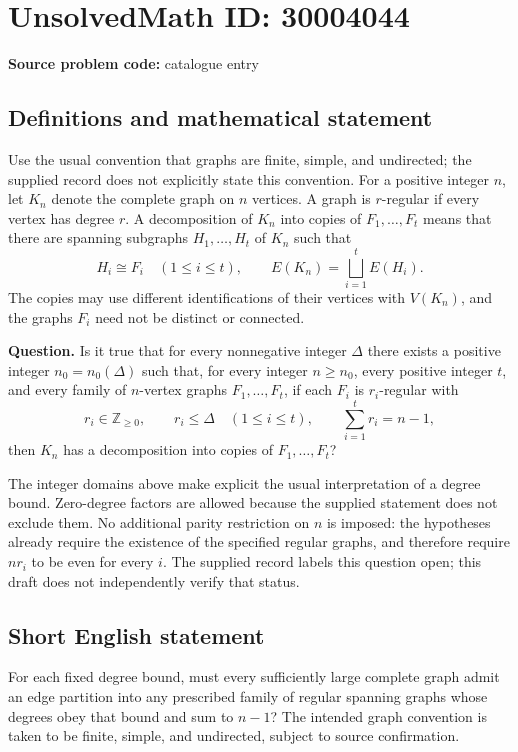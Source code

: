 \documentclass[11pt]{article}
\newcommand{\Z}{\mathbb{Z}}
\begin{document}
\section*{UnsolvedMath ID: 30004044}
\textbf{Source problem code:} catalogue entry
\subsection{Definitions and mathematical statement}
Use the usual convention that graphs are finite, simple, and undirected; the supplied record does not explicitly state this convention. For a positive integer \(n\), let \(K_n\) denote the complete graph on \(n\) vertices. A graph is \(r\)-regular if every vertex has degree \(r\). A decomposition of \(K_n\) into copies of \(F_1,\ldots,F_t\) means that there are spanning subgraphs \(H_1,\ldots,H_t\) of \(K_n\) such that
\[
H_i\cong F_i\quad(1\leq i\leq t),\qquad
E(K_n)=\bigsqcup_{i=1}^{t}E(H_i).
\]
The copies may use different identifications of their vertices with \(V(K_n)\), and the graphs \(F_i\) need not be distinct or connected.

\textbf{Question.} Is it true that for every nonnegative integer \(\Delta\) there exists a positive integer \(n_0=n_0(\Delta)\) such that, for every integer \(n\geq n_0\), every positive integer \(t\), and every family of \(n\)-vertex graphs \(F_1,\ldots,F_t\), if each \(F_i\) is \(r_i\)-regular with
\[
r_i\in\Z_{\geq 0},\qquad r_i\leq\Delta\quad(1\leq i\leq t),\qquad
\sum_{i=1}^{t}r_i=n-1,
\]
then \(K_n\) has a decomposition into copies of \(F_1,\ldots,F_t\)?

The integer domains above make explicit the usual interpretation of a degree bound. Zero-degree factors are allowed because the supplied statement does not exclude them. No additional parity restriction on \(n\) is imposed: the hypotheses already require the existence of the specified regular graphs, and therefore require \(nr_i\) to be even for every \(i\). The supplied record labels this question open; this draft does not independently verify that status.
\subsection{Short English statement}
For each fixed degree bound, must every sufficiently large complete graph admit an edge partition into any prescribed family of regular spanning graphs whose degrees obey that bound and sum to \(n-1\)? The intended graph convention is taken to be finite, simple, and undirected, subject to source confirmation.
\end{document}
